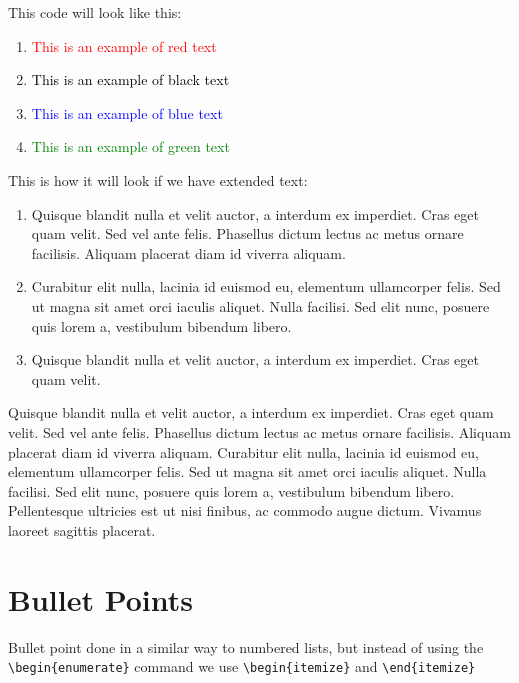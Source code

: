  This code will look like this:
 
    \begin{enumerate}
    \item \textcolor{red}{This is an example of red text}
    \item \textcolor{black}{This is an example of black text}
    \item \textcolor{blue}{This is an example of blue text}
    \item \textcolor{green}{This is an example of green text}
    \end{enumerate}

\normalsize

 This is how it will look if we have extended text:

    \begin{enumerate}
    \item {Quisque blandit nulla et velit auctor, a interdum ex imperdiet. Cras eget quam velit. Sed vel ante felis. Phasellus dictum lectus ac metus ornare facilisis. Aliquam placerat diam id viverra aliquam.}
    \item {Curabitur elit nulla, lacinia id euismod eu, elementum ullamcorper felis. Sed ut magna sit amet orci iaculis aliquet. Nulla facilisi. Sed elit nunc, posuere quis lorem a, vestibulum bibendum libero. }
    \item {Quisque blandit nulla et velit auctor, a interdum ex imperdiet. Cras eget quam velit.}
    \end{enumerate}

Quisque blandit nulla et velit auctor, a interdum ex imperdiet. Cras eget quam velit. Sed vel ante felis. Phasellus dictum lectus ac metus ornare facilisis. Aliquam placerat diam id viverra aliquam. Curabitur elit nulla, lacinia id euismod eu, elementum ullamcorper felis. Sed ut magna sit amet orci iaculis aliquet. Nulla facilisi. Sed elit nunc, posuere quis lorem a, vestibulum bibendum libero. Pellentesque ultricies est ut nisi finibus, ac commodo augue dictum. Vivamus laoreet sagittis placerat.

\newpage

\section{Bullet Points}

Bullet point done in a similar way to numbered lists, but instead of using the \verb|\begin{enumerate}| command we use \verb|\begin{itemize}| and \verb|\end{itemize}|

